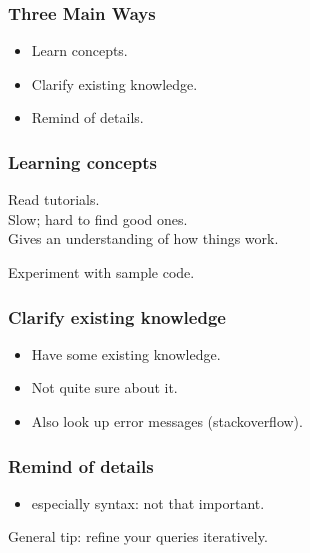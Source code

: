 \begin{frame}
\frametitle{Three Main Ways}

\Large
\begin{changemargin}{2cm}
\begin{itemize}
\item Learn concepts.
\item Clarify existing knowledge.
\item Remind of details.
\end{itemize}
\end{changemargin}
\end{frame}

\begin{frame}
\frametitle{Learning concepts}

\Large
\begin{changemargin}{1.5cm}
\item Read tutorials.\\
Slow; hard to find good ones.\\
Gives an understanding of how things work.
\item Experiment with sample code.
\end{changemargin}
\end{frame}


\begin{frame}
\frametitle{Clarify existing knowledge}

\begin{changemargin}{2cm}
\Large
\begin{itemize}
\item Have some existing knowledge.
\item Not quite sure about it.
\item Also look up error messages (stackoverflow).
\end{itemize}
\end{changemargin}

\end{frame}

\begin{frame}
\frametitle{Remind of details}

\Large
\begin{changemargin}{1cm}
\begin{itemize}
\item especially syntax: not that important.
\end{itemize}

General tip: refine your queries iteratively.
\end{changemargin}
\end{frame}

